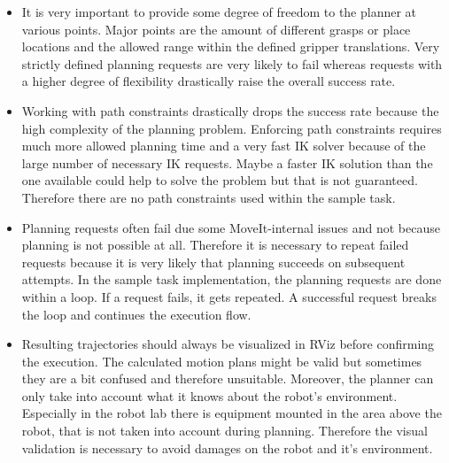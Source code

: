 \begin{itemize}

\item

It is very important to provide some degree of freedom to the planner at various points. Major points are the amount of different grasps or place locations and the allowed range within the defined gripper translations. Very strictly defined planning requests are very likely to fail whereas requests with a higher degree of flexibility drastically raise the overall success rate.

\item

Working with path constraints drastically drops the success rate because the high complexity of the planning problem. Enforcing path constraints requires much more allowed planning time and a very fast IK solver because of the large number of necessary IK requests. Maybe a faster IK solution than the one available could help to solve the problem but that is not guaranteed. Therefore there are no path constraints used within the sample task.

\item

Planning requests often fail due some MoveIt-internal issues and not because planning is not possible at all. Therefore it is necessary to repeat failed requests because it is very likely that planning succeeds on subsequent attempts. In the sample task implementation, the planning requests are done within a loop. If a request fails, it gets repeated. A successful request breaks the loop and continues the execution flow.

\item

Resulting trajectories should always be visualized in RViz before confirming the execution. The calculated motion plans might be valid but sometimes they are a bit confused and therefore unsuitable. Moreover, the planner can only take into account what it knows about the robot's environment. Especially in the robot lab there is equipment mounted in the area above the robot, that is not taken into account during planning. Therefore the visual validation is necessary to avoid damages on the robot and it's environment.

\end{itemize}





%





